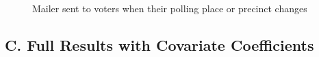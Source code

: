 \documentclass{cup_PSRM}
\begin{document}
\begin{figure}[h!]
	\begin{center}
	\caption{Mailer sent to voters when their polling place or precinct changes}
	\small \bigskip
	\label{figure_mailer}
	\end{center}
\end{figure}






\clearpage \newpage
\subsection{C. Full Results with Covariate Coefficients}\label{appendix_fullresults}
\setcounter{table}{0}
\setcounter{figure}{0}
\renewcommand{\thetable}{C\arabic{table}}
\renewcommand{\thefigure}{C\arabic{figure}}
\end{document}
